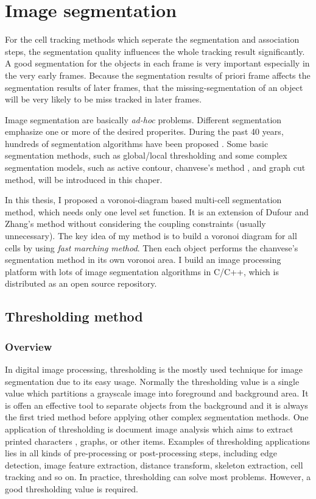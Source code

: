 \chapter{Image segmentation} \label{chpt:imgseg}
For the cell tracking methods which seperate the segmentation and association steps, the segmentation quality influences the whole tracking result significantly. A good segmentation for the objects in each frame is very important especially in the very early frames. Because the segmentation results of priori frame affects the segmentation results of later frames, that the missing-segmentation of an object will be very likely to be miss tracked in later frames.

Image segmentation are basically \emph{ad-hoc} problems. Different segmentation emphasize one or more of the desired properites. During the past 40 years, hundreds of segmentation algorithms have been proposed \cite{freixenet2002yet}. Some basic segmentation methods, such as global/local thresholding and some complex segmentation models, such as active contour, chanvese's method , and graph cut method, will be introduced in this chaper.

In this thesis, I proposed a voronoi-diagram based multi-cell segmentation method, which needs only one level set function. It is an extension of Dufour \cite{dufour2005segmenting} and Zhang's method \cite{zhang2004tracking} without considering the coupling constraints (usually unnecessary). The key idea of my method is to build a voronoi diagram for all cells by using \emph{fast marching method}. Then each object performs the chanvese's segmentation method in its own voronoi area. I build an image processing platform with lots of image segmentation algorithms in C/C++, which is distributed as an open source repository.
\section{Thresholding method}
\subsection{Overview}
In digital image processing, thresholding is the mostly used technique for image segmentation due to its easy usage. Normally the thresholding value is a single value which partitions a grayscale image into foreground and background area. It is offen an effective tool to separate objects from the background and it is always the first tried method before applying other complex segmentation methods. One application of thresholding is document image analysis which aims to extract printed characters \cite{kamel1993extraction,abak1997performance}, graphs, or other items. Examples of thresholding applications lies in all kinds of pre-processing or post-processing steps, including edge detection, image feature extraction, distance transform, skeleton extraction, cell tracking and so on. In practice, thresholding can solve most problems. However, a good thresholding value is required.

